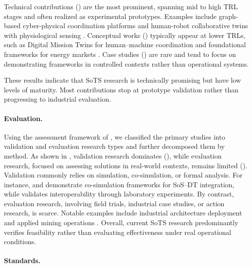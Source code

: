 
Technical contributions () are the most prominent, spanning mid to high TRL stages and often realized as experimental prototypes.
Examples include graph-based cyber-physical coordination platforms \cite{coupaye2023graph-based} and human-robot collaborative twins with physiological sensing \cite{savur2019hrc-sos}. Conceptual works () typically appear at lower TRLs, such as Digital Mission Twins for human–machine coordination \cite{folds2019digital} and foundational frameworks for energy markets \cite{wullink2024foundational}.
Case studies () are rare and tend to focus on demonstrating frameworks in controlled contexts rather than operational systems.

These results indicate that SoTS research is technically promising but have low levels of maturity. Most contributions stop at prototype validation rather than progressing to industrial evaluation.



\paragraph{Evaluation.}
Using the assessment framework of \citet{petersen2015guidelines}, we classified the primary studies into validation and evaluation research types and further decomposed them by method. As shown in , validation research dominates (), while evaluation research, focused on assessing solutions in real-world contexts, remains limited ().
Validation commonly relies on simulation, co-simulation, or formal analysis. For instance, \citet{hatledal2020co-simulation} and \citet{chen2018digital} demonstrate co-simulation frameworks for SoS–DT integration, while \citet{priyanta2024is} validates interoperability through laboratory experiments. By contrast, evaluation research, involving field trials, industrial case studies, or action research, is scarce. Notable examples include industrial architecture deployment \cite{ashtaritalkhestani2019architecture} and applied mining operations \cite{bertoni2022digital}. Overall, current SoTS research predominantly verifies feasibility rather than evaluating effectiveness under real operational conditions.

\paragraph{Standards.}
\label{sec:standards}


